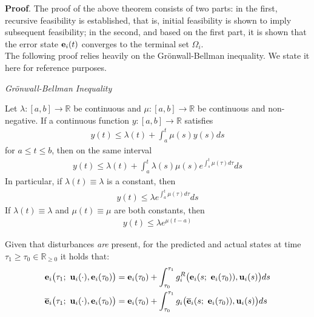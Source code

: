 \textbf{Proof}. The proof of the above theorem consists of two parts:
in the first, recursive feasibility is established, that is, initial
feasibility is shown to imply subsequent feasibility; in the second, and based
on the first part, it is shown that the error state $\bm{\mathbf{e}}_i(t)$ converges
to the terminal set $\Omega_i$.\\

The following proof relies heavily on the Gr\"{o}nwall-Bellman inequality.
We state it here for reference purposes.
\begin{bw_box}
  \begin{lemma} \cite{khalil_nonlinear_systems} \textit{Gr\"{o}nwall-Bellman Inequality}

    Let $\lambda : [a,b] \to \mathbb{R}$ be continuous and
    $\mu : [a,b] \to \mathbb{R}$ be continuous and non-negative. If a
    continuous function $y : [a,b] \to \mathbb{R}$ satisfies
    \begin{align}
      y(t) \leq \lambda(t) + \int_a^t \mu(s) y(s) ds
    \end{align}
    for $a \leq t \leq b$, then on the same interval
    \begin{align}
      y(t) \leq \lambda(t) + \int_a^t \lambda(s) \mu(s) e^{\int_s^t \mu(\tau)d\tau} ds
    \end{align}
    In particular, if $\lambda(t) \equiv \lambda$ is a constant, then
    \begin{align}
      y(t) \leq \lambda e^{\int_a^t \mu(\tau)d\tau} ds
    \end{align}
    If $\lambda(t) \equiv \lambda$ and $\mu(t) \equiv \mu$ are both constants,
    then
    \begin{align}
      y(t) \leq \lambda e^{\mu (t - a)}
    \end{align}
    \label{lemma:bellman_inequality}
  \end{lemma}
\end{bw_box}

\begin{bw_box}
  \begin{remark}
    Given that disturbances \textit{are} present, for the predicted and actual
    states at time $\tau_1 \geq \tau_0 \in \mathbb{R}_{\geq 0}$ it holds that:
    \begin{align}
      \bm{\mathbf{e}}_i\big(\tau_1;\ \bm{\mathbf{u}}_i(\cdot), \bm{\mathbf{e}}_i(\tau_0)\big) &=
        \bm{\mathbf{e}}_i(\tau_0) + \int_{\tau_0}^{\tau_1} g_i^R\big(\bm{\mathbf{e}}_i(s;\ \bm{\mathbf{e}}_i(\tau_0)), \bm{\mathbf{u}}_i(s)\big) ds \\
      \overline{\bm{\mathbf{e}}}_i\big(\tau_1;\ \bm{\mathbf{u}}_i(\cdot), \bm{\mathbf{e}}_i(\tau_0)\big) &=
        \bm{\mathbf{e}}_i(\tau_0) + \int_{\tau_0}^{\tau_1} g_i\big(\overline{\bm{\mathbf{e}}}_i(s;\ \bm{\mathbf{e}}_i(\tau_0)), \bm{\mathbf{u}}_i(s)\big) ds
    \end{align}
    \label{remark:predicted_actual_equations_with_disturbance}
  \end{remark}
\end{bw_box}


